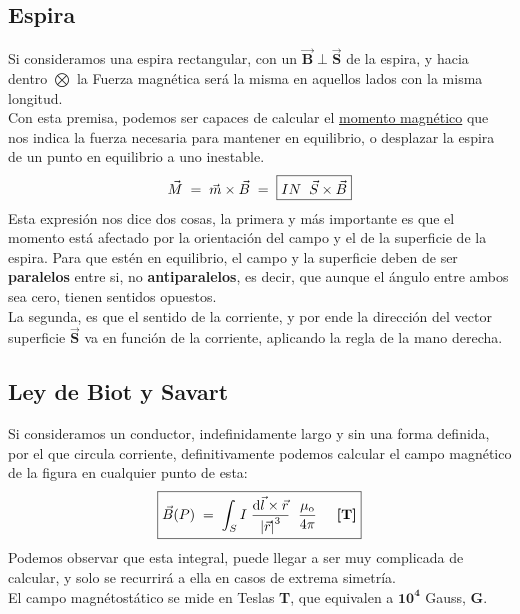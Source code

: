 \subsection{Espira}
 Si consideramos una espira rectangular, con un \(\bm{\vec{B}\perp\vec{S}}\) de la espira, y hacia dentro \(\bm{\bigotimes}\) la Fuerza magnética será la misma en aquellos lados con la misma longitud.
\\
Con esta premisa, podemos ser capaces de calcular el \underline{momento magnético} que nos indica la fuerza necesaria para mantener en equilibrio, o desplazar la espira de un punto en equilibrio a uno inestable.
\[
        \vec{M} \hspace{1mm} = \hspace{1mm} \vec{m}\times\vec{B} \hspace{1mm} = \hspace{1mm} \boxed{IN \hspace{2mm} \vec{S} \times \vec{B}}
\]
Esta expresión nos dice dos cosas, la primera y más importante es que el momento está afectado por la orientación del campo y el de la superficie de la espira. Para que estén en equilibrio, el campo y la superficie deben de ser \textbf{paralelos} entre si, no \textbf{antiparalelos}, es decir, que aunque el ángulo entre ambos sea cero, tienen sentidos opuestos.
\\
La segunda, es que el sentido de la corriente, y por ende la dirección del vector superficie \(\bm{\vec{S}}\) va en función de la corriente, aplicando la regla de la mano derecha. %
\subsection{Ley de Biot y Savart}
 Si consideramos un conductor, indefinidamente largo y sin una forma definida, por el que circula corriente, definitivamente podemos calcular el campo magnético de la figura en cualquier punto de esta:
\[
        \boxed{\vec{B}(P) \hspace{1mm}= \hspace{1mm}\int_{S} I\hspace{1mm}\frac{\mathrm{d}\vec{l}\times\vec{r}}{\left | \vec{r} \right |^3}\hspace{2mm}\frac{\mu_{\textnormal{o}}}{4\pi} \hspace{5mm}\textnormal{\textbf{[T]}}}
\]
 Podemos observar que esta integral, puede llegar a ser muy complicada de calcular, y solo se recurrirá a ella en casos de extrema simetría.\\
El campo magnétostático se mide en Teslas \textbf{T}, que equivalen a \(\mathbf{10^4}\) Gauss, \textbf{G}.

